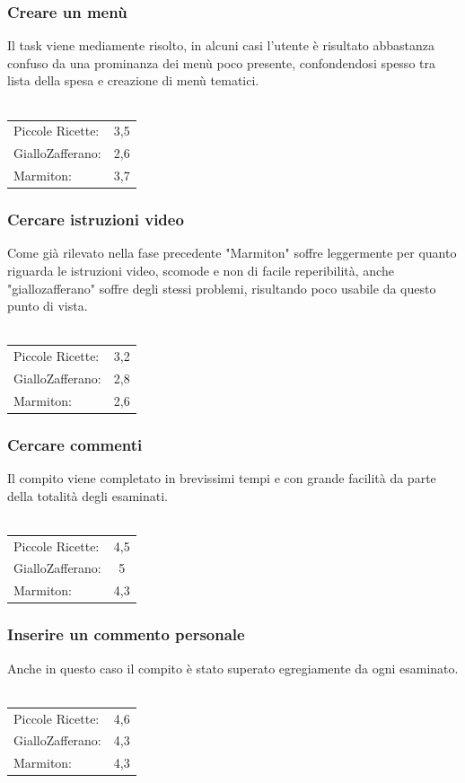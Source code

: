 \subsubsection{Creare un menù}
Il task viene mediamente risolto, in alcuni casi l'utente è risultato abbastanza
confuso da una prominanza dei menù poco presente, confondendosi spesso tra lista
della spesa e creazione di menù tematici.\\\\
\begin{tabular}{l c}
Piccole Ricette: & 3,5\\
GialloZafferano: & 2,6\\
Marmiton: & 3,7\\
\end{tabular}

\subsubsection{Cercare istruzioni video}
Come già rilevato nella fase precedente "Marmiton" soffre leggermente per quanto
riguarda le istruzioni video, scomode e non di facile reperibilità, anche
"giallozafferano" soffre degli stessi problemi, risultando poco usabile da questo
punto di vista.\\\\
\begin{tabular}{l c}
Piccole Ricette: & 3,2\\
GialloZafferano: & 2,8\\
Marmiton: & 2,6\\
\end{tabular}

\subsubsection{Cercare commenti}
Il compito viene completato in brevissimi tempi e con grande facilità da parte
della totalità degli esaminati.\\\\
\begin{tabular}{l c}
Piccole Ricette: & 4,5\\
GialloZafferano: & 5\\
Marmiton: & 4,3\\
\end{tabular}

\subsubsection{Inserire un commento personale}
Anche in questo caso il compito è stato superato egregiamente da ogni
esaminato.\\\\
\begin{tabular}{l c}
Piccole Ricette: & 4,6\\
GialloZafferano: & 4,3\\
Marmiton: & 4,3\\
\end{tabular}

